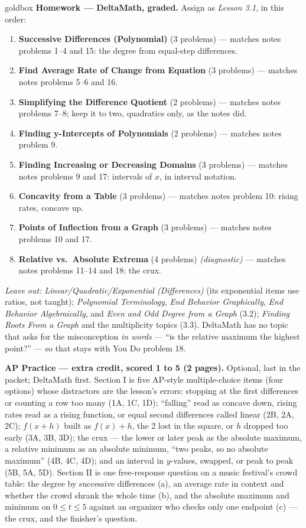 \documentclass[10pt]{article}
\begin{document}
\begin{skillbox}{goldbox}
\textbf{Homework --- DeltaMath, graded.} Assign as \textit{Lesson 3.1}, in this order:
\begin{enumerate}[itemsep=1pt,topsep=2pt]
  \item \textbf{Successive Differences (Polynomial)} (3 problems) --- matches notes problems
        1--4 and 15: the degree from equal-step differences.
  \item \textbf{Find Average Rate of Change from Equation} (3 problems) --- matches notes
        problems 5--6 and 16.
  \item \textbf{Simplifying the Difference Quotient} (2 problems) --- matches notes problems
        7--8; keep it to two, quadratics only, as the notes did.
  \item \textbf{Finding y-Intercepts of Polynomials} (2 problems) --- matches notes problem 9.
  \item \textbf{Finding Increasing or Decreasing Domains} (3 problems) --- matches notes
        problems 9 and 17: intervals of $x$, in interval notation.
  \item \textbf{Concavity from a Table} (3 problems) --- matches notes problem 10: rising rates,
        concave up.
  \item \textbf{Points of Inflection from a Graph} (3 problems) --- matches notes problems 10
        and 17.
  \item \textbf{Relative vs.\ Absolute Extrema} (4 problems) \textit{(diagnostic)} --- matches
        notes problems 11--14 and 18: the crux.
\end{enumerate}
\textit{Leave out:} \textit{Linear/Quadratic/Exponential (Differences)} (its exponential items
use ratios, not taught); \textit{Polynomial Terminology}, \textit{End Behavior Graphically},
\textit{End Behavior Algebraically}, and \textit{Even and Odd Degree from a Graph} (3.2);
\textit{Finding Roots From a Graph} and the multiplicity topics (3.3). DeltaMath has no topic
that asks for the misconception \emph{in words} --- ``is the relative maximum the highest
point?'' --- so that stays with You Do problem 18.

\textbf{AP Practice --- extra credit, scored 1 to 5 (2 pages).} Optional, last in the packet;
DeltaMath first. Section I is five AP-style multiple-choice items (four options) whose
distractors are the lesson's errors: stopping at the first differences or counting a row too
many (1A, 1C, 1D); ``falling'' read as concave down, rising rates read as a rising function, or
equal second differences called linear (2B, 2A, 2C); $f(x + h)$ built as $f(x) + h$, the 2 lost
in the square, or $h$ dropped too early (3A, 3B, 3D); the crux --- the lower or later peak as
the absolute maximum, a relative minimum as an absolute minimum, ``two peaks, so no absolute
maximum'' (4B, 4C, 4D); and an interval in $y$-values, swapped, or peak to peak (5B, 5A, 5D).
Section II is one free-response question on a music festival's crowd table: the degree by
successive differences (a), an average rate in context and whether the crowd shrank the whole
time (b), and the absolute maximum and minimum on $0 \le t \le 5$ against an organizer who
checks only one endpoint (c) --- the crux, and the finisher's question.


\end{skillbox}
\end{document}
